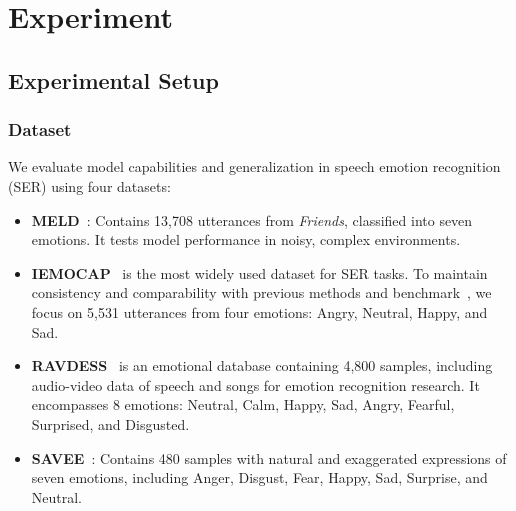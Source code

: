 \documentclass[11pt]{article}
\begin{document}
\section{Experiment}
\subsection{Experimental Setup}
\subsubsection{Dataset}
We evaluate model capabilities and generalization in speech emotion recognition (SER) using four datasets:
\begin{itemize}[leftmargin=10pt]
	\item
	      \textbf{MELD}~\citep{poria2018meld}: Contains 13,708 utterances from \emph{Friends}, classified into seven emotions. It tests model performance in noisy, complex environments.
	\item
	      \textbf{IEMOCAP}~\citep{busso2008iemocap} is the most widely used dataset for SER tasks. To maintain consistency and comparability with previous methods and benchmark~\citep{ye2023temporal,ma2024emobox}, we focus on 5,531 utterances from four emotions: Angry, Neutral, Happy, and Sad.
	\item
	      \textbf{RAVDESS}~\citep{livingstone2018ryerson} is an emotional database containing 4,800 samples, including audio-video data of speech and songs for emotion recognition research. It encompasses 8 emotions: Neutral, Calm, Happy, Sad, Angry, Fearful, Surprised, and Disgusted.
	\item
	      \textbf{SAVEE}~\citep{jackson2014surrey}: Contains 480 samples with natural and exaggerated expressions of seven emotions, including Anger, Disgust, Fear, Happy, Sad, Surprise, and Neutral.

\end{itemize}

\end{document}
